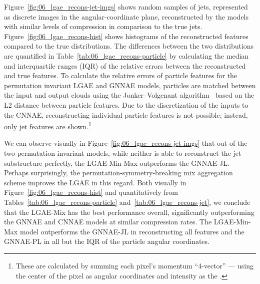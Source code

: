 Figure~\ref{fig:06_lgae_recons-jet-imgs} shows random samples of jets, represented as discrete images in the angular-coordinate plane, reconstructed by the models with similar levels of compression in comparison to the true jets.
Figure~\ref{fig:06_lgae_recons-hist} shows histograms of the reconstructed features compared to the true distributions.
The differences between the two distributions are quantified in Table~\ref{tab:06_lgae_recons-particle} by calculating the median and interquartile ranges (IQR) of the relative errors between the reconstructed and true features.
To calculate the relative errors of particle features for the permutation invariant LGAE and GNNAE models, particles are matched between the input and output clouds using the Jonker–Volgenant algorithm~\cite{JonkerVolgenant,2020SciPy-NMeth} based on the L2 distance between particle features.
Due to the discretization of the inputs to the CNNAE, reconstructing individual particle features is not possible; instead, only jet features are shown.\footnote{These are calculated by summing each pixel's momentum ``4-vector'' --- using the center of the pixel as angular coordinates and intensity as the \ptrel.}

We can observe visually in Figure~\ref{fig:06_lgae_recons-jet-imgs} that out of the two permutation invariant models, while neither is able to reconstruct the jet substructure perfectly,
the LGAE-Min-Max outperforms the GNNAE-JL.
Perhaps surprisingly, the permutation-symmetry-breaking mix aggregation scheme improves the LGAE in this regard.
Both visually in Figure~\ref{fig:06_lgae_recons-hist} and quantitatively from Tables~\ref{tab:06_lgae_recons-particle} and~\ref{tab:06_lgae_recons-jet}, we conclude that the LGAE-Mix has the best performance overall, significantly outperforming the GNNAE and CNNAE models at similar compression rates.
The LGAE-Min-Max model outperforms the GNNAE-JL in reconstructing all features and the GNNAE-PL in all but the IQR of the particle angular coordinates.

